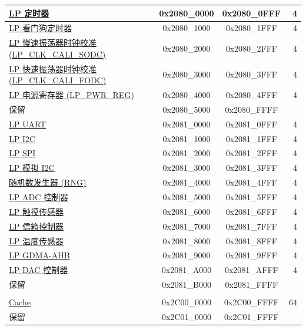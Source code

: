 \begin{ThreePartTable}
\begin{longtable}[c]{ |p{7cm}|c|c|r| }
    \hyperref[mod:rtctimer]{LP 定时器} & 0x2080\_0000 & 0x2080\_0FFF &   4\\\hline
    \hyperref[mod:wdt]{LP 看门狗定时器} & 0x2080\_1000 & 0x2080\_1FFF &   4\\\hline
    \hyperref[mod:resclk]{LP 慢速振荡器时钟校准 (LP\_CLK\_CALI\_SODC)} & 0x2080\_2000 & 0x2080\_2FFF &   4\\\hline
    \hyperref[mod:resclk]{LP 快速振荡器时钟校准 (LP\_CLK\_CALI\_FODC)} & 0x2080\_3000 & 0x2080\_3FFF &   4\\\hline
    \hyperref[mod:lowpowm]{LP 电源寄存器 (LP\_PWR\_REG)} & 0x2080\_4000 & 0x2080\_4FFF &   4\\\hline
        \rowcolor{gray!25}  保留          & 0x2080\_5000 & 0x2080\_FFFF &    \\\hline
    \hyperref[mod:uart]{LP UART} & 0x2081\_0000 & 0x2081\_0FFF &   4\\\hline
    \hyperref[mod:i2c]{LP I2C} & 0x2081\_1000 & 0x2081\_1FFF &   4\\\hline
    \hyperref[mod:spi]{LP SPI} & 0x2081\_2000 & 0x2081\_2FFF &   4\\\hline
    \hyperref[mod:lowpowm]{LP 模拟 I2C} & 0x2081\_3000 & 0x2081\_3FFF &   4\\\hline
    \hyperref[mod:rng]{随机数发生器 (RNG)} & 0x2081\_4000 & 0x2081\_4FFF &   4\\\hline
    \hyperref[mod:adc]{LP ADC 控制器} & 0x2081\_5000 & 0x2081\_5FFF &   4\\\hline
    \hyperref[mod:tchsen]{LP 触摸传感器} & 0x2081\_6000 & 0x2081\_6FFF &   4\\\hline
    \hyperref[mod:lpmailbox]{LP 信箱控制器} & 0x2081\_7000 & 0x2081\_7FFF &   4\\\hline
    \hyperref[mod:tmpsen]{LP 温度传感器} & 0x2081\_8000 & 0x2081\_8FFF &   4\\\hline
    \hyperref[mod:dma]{LP GDMA-AHB} & 0x2081\_9000 & 0x2081\_9FFF &   4\\\hline
    \hyperref[mod:dac]{LP DAC 控制器} & 0x2081\_A000 & 0x2081\_AFFF &   4\\\hline
        \rowcolor{gray!25}  保留          & 0x2081\_B000 & 0x2081\_FFFF &    \\\hline

        \rowcolor{lightgray}\multicolumn{4}{|l|}{\textbf{CPU 外设}}\\\hline
    \hyperref[mod:cache]{Cache}           & 0x2C00\_0000 & 0x2C00\_FFFF &  64\\\hline
        \rowcolor{gray!25}  保留          & 0x2C01\_0000 & 0x2C01\_FFFF &    \\\hline


\end{longtable}
\end{ThreePartTable}

